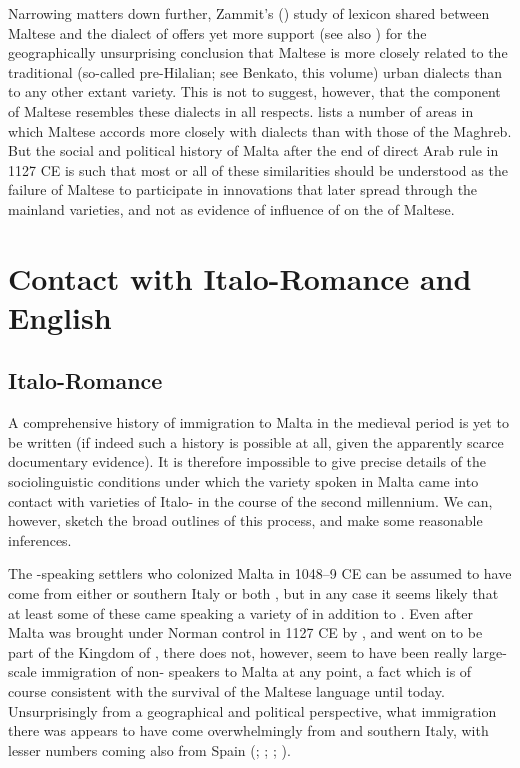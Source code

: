 \documentclass[output=paper]{langsci/langscibook}
\begin{document}
Narrowing matters down further, Zammit's (\citeyear{zammit2014}) study of lexicon shared between Maltese and the  dialect of  offers yet more support (see also \citealt{Vanhove1998}) for the geographically unsurprising conclusion that Maltese is more closely related to the traditional (so-called pre-Hilalian; see Benkato, this volume) urban  dialects than to any other extant  variety. This is not to suggest, however, that the  component of Maltese resembles these dialects in all respects. \cite{Borg1996} lists a number of areas in which Maltese accords more closely with   dialects than with those of the Maghreb. But the social and political history of Malta after the end of direct Arab rule in 1127 CE is such that most or all of these similarities should be understood as the failure of Maltese to participate in innovations that later spread through the mainland  varieties, and not as evidence of influence of   on the  of Maltese.

\section{Contact with Italo-Romance and English}
\subsection{Italo-Romance}

A comprehensive history of immigration to Malta in the medieval period is yet to be written (if indeed such a history is possible at all, given the apparently scarce documentary evidence). It is therefore impossible to give precise details of the sociolinguistic conditions under which the  variety spoken in Malta came into contact with varieties of Italo- in the course of the second millennium. We can, however, sketch the broad outlines of this process, and make some reasonable inferences.

The -speaking settlers who colonized Malta in 1048--9 CE can be assumed to have come from either  or southern Italy or both \citep[22]{brincat1995}, but in any case it seems likely that at least some of these came speaking a variety of  in addition to . Even after Malta was brought under Norman control in 1127 CE by , and went on to be part of the Kingdom of , there does not, however, seem to have been really large-scale immigration of non- speakers to Malta at any point, a fact which is of course consistent with the survival of the Maltese language until today. Unsurprisingly from a geographical and political perspective, what immigration there was appears to have come overwhelmingly from  and southern Italy, with lesser numbers coming also from Spain (\citealt[134, 289]{ballou1893}; \citealt[43--46]{blouet1967}; \citealt{fiorini1986}; \citealt[26--32]{goodwin2002}).
\end{document}

